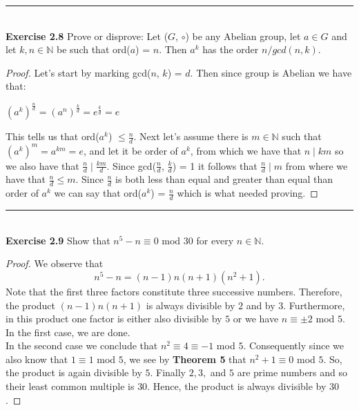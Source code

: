 \documentclass[a4paper]{article}
\begin{document}
\noindent\rule{12cm}{0.4pt}\\
\noindent \textbf{Exercise 2.8} Prove or disprove: Let ($G$, $\circ$) be any Abelian group, let $a \in G$ and let $k, n \in \mathbb{N}$ be such that ord($a$) = $n$. Then $a^{k}$ has the order $n/gcd(n,k)$.
\begin{proof}
Let's start by marking gcd($n$, $k$) = $d$. Then since group is Abelian we have that:
\begin{center}
$(a^k)^{\frac{n}{d}} = (a^n)^{\frac{k}{d}}= e^{\frac{k}{d}} = e$
\end{center}
This tells us that ord($a^k$) $\leq \frac{n}{d}$. Next let's assume there is $m \in \mathbb{N}$ such that $(a^k)^m=a^{km}=e$, and let it be order of $a^k$, from which we have that $n \mid km$ so we also have that $\frac{n}{d} \mid \frac{km}{d}$. Since gcd($\frac{n}{d}$, $\frac{k}{d}$) = 1 it follows that $\frac{n}{d} \mid m$ from where we have that $\frac{n}{d} \leq m$. Since $\frac{n}{d}$ is both less than equal and greater than equal than order of $a^k$ we can say that ord($a^k$) = $\frac{n}{d}$ which is what needed proving.
\end{proof}



\noindent\rule{12cm}{0.4pt}\\
\noindent \textbf{Exercise 2.9} Show that $n^5 - n \equiv 0$ mod 30 for every $n \in \mathbb{N}$.
\begin{proof}
We observe that
$$ n^{5} - n = (n - 1)n(n+1)(n^{2} +1).$$
Note that the first three factors constitute three successive numbers. Therefore, the product $(n-1)n(n+1)$ is always divisible by $2$ and by $3$. Furthermore, in this product one factor is either also divisible by $5$ or we have $n \equiv \pm 2$ mod $5$. In the first case, we are done.\\
In the second case we conclude that $n^{2} \equiv 4 \equiv -1$ mod $5$. Consequently since we also know that $1 \equiv 1$ mod $5$, we see by \textbf{Theorem 5} that $n^{2} + 1 \equiv 0$ mod $5$. So, the product is again divisible by $5$. Finally $2, 3,$ and $5$ are prime numbers and so their least common multiple is $30$. Hence, the product is always divisible by $30$.
\end{proof}
\end{document}
